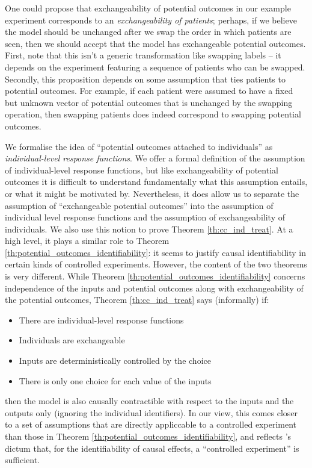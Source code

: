 One could propose that exchangeability of potential outcomes in our example experiment corresponds to an \emph{exchangeability of patients}; perhaps, if we believe the model should be unchanged after we swap the order in which patients are seen, then we should accept that the model has exchangeable potential outcomes. First, note that this isn't a generic transformation like swapping labels -- it depends on the experiment featuring a sequence of patients who can be swapped. Secondly, this proposition depends on some assumption that ties patients to potential outcomes. For example, if each patient were assumed to have a fixed but unknown vector of potential outcomes that is unchanged by the swapping operation, then swapping patients does indeed correspond to swapping potential outcomes.

We formalise the idea of ``potential outcomes attached to individuals'' as \emph{individual-level response functions}. We offer a formal definition of the assumption of individual-level response functions, but like exchangeability of potential outcomes it is difficult to understand fundamentally what this assumption entails, or what it might be motivated by. Nevertheless, it does allow us to separate the assumption of ``exchangeable potential outcomes'' into the assumption of individual level response functions and the assumption of exchangeability of individuals. We also use this notion to prove Theorem \ref{th:cc_ind_treat}. At a high level, it plays a similar role to Theorem \ref{th:potential_outcomes_identifiability}: it seems to justify causal identifiability in certain kinds of controlled experiments. However, the content of the two theorems is very different. While Theorem \ref{th:potential_outcomes_identifiability} concerns independence of the inputs and potential outcomes along with exchangeability of the potential outcomes, Theorem \ref{th:cc_ind_treat} says (informally) if:
\begin{itemize}
    \item There are individual-level response functions
    \item Individuals are exchangeable
    \item Inputs are deterministically controlled by the choice
    \item There is only one choice for each value of the inputs
\end{itemize}
then the model is also causally contractible with respect to the inputs and the outputs only (ignoring the individual identifiers). In our view, this comes closer to a set of assumptions that are directly appliccable to a controlled experiment than those in Theorem \ref{th:potential_outcomes_identifiability}, and reflects \citet{kasy_why_2016}'s dictum that, for the identifiability of causal effects, a ``controlled experiment'' is sufficient.

